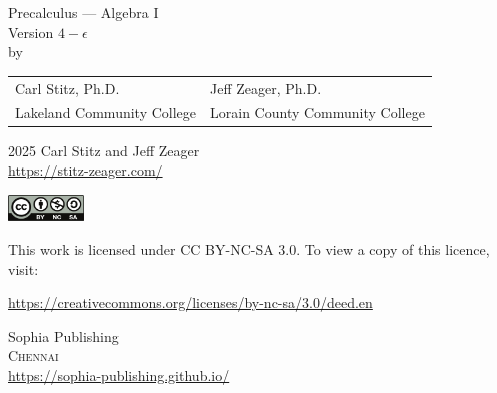 \begin{titlepage}
\begin{center}

\vspace*{0.1\paperheight}

\Huge Precalculus --- Algebra I  \\ \vspace{.1in} \large Version $4 - \epsilon$  \\ \vspace{.25in} \large by

\vspace{0.1\paperheight}

\begin{tabularx}{0.953\linewidth}{YY} Carl Stitz, Ph.D. &  Jeff Zeager, Ph.D. \\ Lakeland Community College & Lorain County Community College \\\end{tabularx}

\vfill

\begin{center}
    \sophia
\end{center}

\end{center}
\end{titlepage}

\begingroup
\footnotesize
\setlength{\parindent}{0pt}
\setlength{\parskip}{\baselineskip}

\textcopyright{} 2025 Carl Stitz and Jeff Zeager \\
\url{https://stitz-zeager.com/}

\includegraphics[height=20pt]{../by-nc-sa.pdf}

This work is licensed under CC BY-NC-SA 3.0. To view a copy of this licence,
visit:

\url{https://creativecommons.org/licenses/by-nc-sa/3.0/deed.en}

\vfill

Sophia Publishing \\
\textsc{Chennai} \\
\url{https://sophia-publishing.github.io/} \\
\endgroup

%

\thispagestyle{empty}

